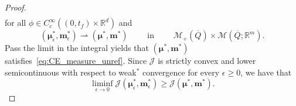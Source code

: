 \documentclass{amsart}
\numberwithin{equation}{section}
\begin{document}
\begin{proof}
\begin{multline}
\end{multline}
for all $\phi\in C_c^\infty((0,t_f)\times\mathbb R^d)$ and
\begin{equation}
    \label{eq:weak_convergence}
    (\boldsymbol{\mu}_\epsilon^*, \mathbf{m}_\epsilon^*) \rightharpoonup (\boldsymbol{\mu}^*, \mathbf{m}^*)\qquad \text{ in }\qquad \mathcal{M}_+(\overline{Q})\times\mathcal{M}(\overline{Q}; \mathbb{R}^m).
\end{equation}
Pass the limit in the integral yields that $(\boldsymbol{\mu}^*, \mathbf{m}^*)$ satisfies~\eqref{eq:CE_measure_unref}. Since $\mathcal{J}$ is strictly convex and lower semicontinuous with respect to weak$^*$ convergence for every $\epsilon\geq 0$, we have that
\begin{equation}
    \label{eq:lsc_cost}
    \liminf_{\epsilon \to 0}\mathcal{J}(\boldsymbol{\mu}_\epsilon^*, \mathbf{m}_\epsilon^*) \geq \mathcal{J}(\boldsymbol{\mu}^*, \mathbf{m}^*).
\end{equation}



\end{proof}
\end{document}
